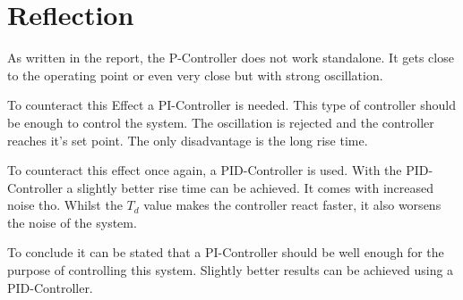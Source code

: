 \section{Reflection}

As written in the report, the P-Controller does not work standalone. It gets close to the operating point or even very close but with strong oscillation.

To counteract this Effect a PI-Controller is needed. This type of controller should be enough to control the system. The oscillation is rejected and the controller reaches it's set point. The only disadvantage is the long rise time.

To counteract this effect once again, a PID-Controller is used. With the PID-Controller a slightly better rise time can be achieved. It comes with increased noise tho. Whilst the $T_d$ value makes the controller react faster, it also worsens the noise of the system.

To conclude it can be stated that a PI-Controller should be well enough for the purpose of controlling this system. Slightly better results can be achieved using a PID-Controller.